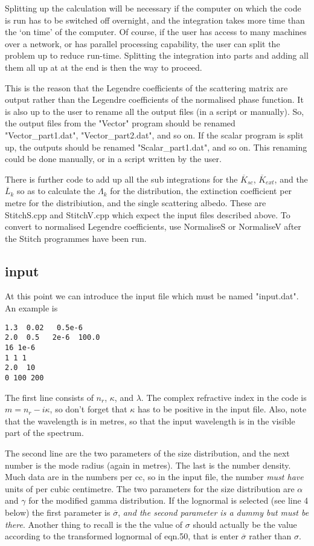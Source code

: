 \begin{flushleft}
Splitting up the calculation will be necessary if the computer on which
the code is run has to be switched off overnight, and the integration takes more
time  than the `on time' of the computer. Of course, if the user has access to many
 machines over a network, or has parallel processing capability, the user can split 
the problem up to reduce run-time.
Splitting the integration into parts
and adding all them all up at at the end is then the way to proceed.

This is the reason that the Legendre coefficients of the scattering matrix
are output rather than the Legendre coefficients of the normalised phase function.
It is also up to the user to rename all the output files (in a script or manually).
So, the output files from the "Vector" program should be renamed "Vector\_part1.dat",
 "Vector\_part2.dat", and so on. If the scalar program is split up, the outputs
should be renamed "Scalar\_part1.dat", and so on. This renaming could be done
 manually, or in a script written by the user.

There is  further code to add up all the sub integrations for the ${\overline K_{sc}}$,
 ${\overline K_{ext}}$, 
and the ${\overline L_k}$ so as to calculate the $\Lambda_k$
for the distribution, the extinction coefficient per metre for the distribiution, and
the single scattering albedo. These are StitchS.cpp and StitchV.cpp which expect the 
input files described above. To convert to normalised Legendre coefficients, use NormaliseS or NormaliseV after the Stitch programmes have been run.


\subsection{input}
At this point we can introduce the input file which must be named "input.dat".
An example is
\begin{verbatim}
1.3  0.02   0.5e-6         
2.0  0.5   2e-6  100.0
16 1e-6
1 1 1
2.0  10
0 100 200
\end{verbatim}
The first line consists of $n_r$, $\kappa$, and $\lambda$. The complex
refractive index  in the code is $m=n_r-i \kappa$, so don't forget that $\kappa$ has
to be positive in the input file. Also, note that the wavelength is in metres,
so that the input wavelength is in the visible part of the spectrum.

The second line are the two  parameters of the size distribution,
and the next number is the mode radius (again in metres). The last is
the number density. Much data are in the numbers per cc, so in the input
file, the number {\it must have} units of per cubic centimetre.
 The two parameters for the 
size distribution are $\alpha$ and $\gamma$ for the modified gamma distribution.
If the lognormal is selected (see line 4 below) the first parameter is 
${\overline \sigma}$, {\it and the second parameter is a dummy but must be there}. 
Another thing to recall is the the value of $\sigma$ should actually be
the value according to the transformed lognormal of eqn.50, that is
enter ${\overline \sigma}$ rather than $\sigma$.  


\end{flushleft}
